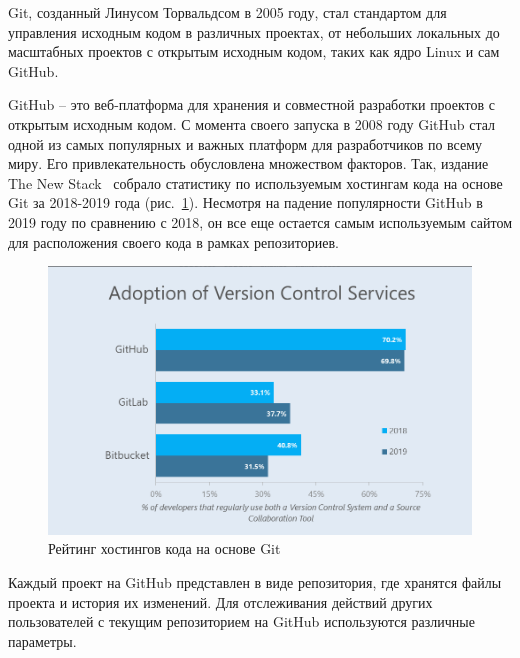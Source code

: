 Git, созданный Линусом Торвальдсом в 2005 году, стал стандартом для управления исходным кодом в различных проектах, от небольших локальных до масштабных проектов с открытым исходным кодом, таких как ядро Linux и сам GitHub.

GitHub -- это веб-платформа для хранения и совместной разработки проектов с открытым исходным кодом. С момента своего запуска в 2008 году GitHub стал одной из самых популярных и важных платформ для разработчиков по всему миру. Его привлекательность обусловлена множеством факторов. Так, издание The New Stack~\cite{GitRating} собрало статистику по используемым хостингам кода на основе Git за 2018-2019 года (рис.~\ref{ris:gitrating}). Несмотря на падение популярности GitHub в 2019 году по сравнению с 2018, он все еще остается самым используемым сайтом для расположения своего кода в рамках репозиториев.

\begin{figure}[h]
    \centering
    \includegraphics[width=1\linewidth]{pic/gitrating.png}
    \vspace{-1em}\caption{Рейтинг хостингов кода на основе Git}
    \label{ris:gitrating}
\end{figure}
\vspace{1em}

Каждый проект на GitHub представлен в виде репозитория, где хранятся файлы проекта и история их изменений. Для отслеживания действий других пользователей с текущим репозиторием на GitHub используются различные параметры.

